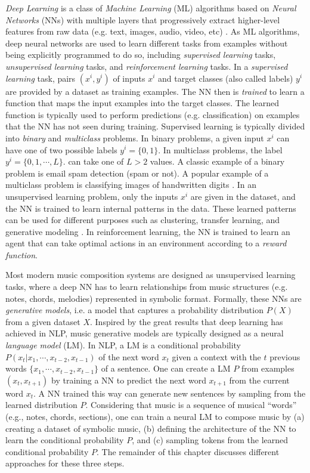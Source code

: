 \textit{Deep Learning} is a class of \textit{Machine Learning} (ML) algorithms based on \textit{Neural Networks} (NNs) with multiple layers that progressively extract higher-level features from raw data (e.g. text, images, audio, video, etc) \cite{goodfellow2016deep}. As ML algorithms, deep neural networks are used to learn different tasks from examples without being explicitly programmed to do so, including \textit{supervised learning} tasks, \textit{unsupervised learning} tasks, and \textit{reinforcement learning} tasks. In a \textit{supervised learning} task, pairs $(x^i,y^i)$ of inputs $x^i$ and target classes (also called labels) $y^i$ are provided by a dataset as training examples. The NN then is \textit{trained} to learn a function that maps the input examples into the target classes. The learned function is typically used to perform predictions (e.g. classification) on examples that the NN has not seen during training. Supervised learning is typically divided into \textit{binary} and \textit{multiclass} problems. In binary problems, a given input $x^i$ can have one of two possible labels $y^i = \{0, 1\}$. In multiclass problems, the label $y^i = \{0, 1, \cdots, L\}$. can take one of $L > 2$ values. A classic example of a binary problem is email spam detection (spam or not). A popular example of a multiclass problem is classifying images of handwritten digits \cite{lecun1998gradient}. In an unsupervised learning problem, only the inputs $x^i$ are given in the dataset, and the NN is trained to learn internal patterns in the data. These learned patterns can be used for different purposes such as clustering, transfer learning, and generative modeling \cite{bengio2012unsupervised}. In reinforcement learning, the NN is trained to learn an agent that can take optimal actions in an environment according to a \textit{reward function}.

Most modern music composition systems are designed as unsupervised learning tasks, where a deep NN has to learn relationships from music structures (e.g. notes, chords, melodies) represented in symbolic format. Formally, these NNs are \textit{generative models}, i.e. a model that captures a probability distribution $P(X)$ from a given dataset $X$. Inspired by the great results that deep learning has achieved in NLP, music generative models are typically designed as a neural \textit{language model} (LM). In NLP, a LM is a conditional probability $P(x_t|x_1, \cdots, x_{t-2}, x_{t-1})$ of the next word $x_t$ given a context with the $t$ previous words $\{x_1, \cdots, x_{t-2}, x_{t-1}\}$ of a sentence. One can create a LM $P$ from examples $(x_t, x_{t+1})$ by training a NN to predict the next word $x_{t+1}$  from the current word $x_t$. A NN trained this way can generate new sentences by sampling from the learned distribution $P$. Considering that music is a sequence of musical ``words'' (e.g., notes, chords, sections), one can train a neural LM to compose music by (a) creating a dataset of symbolic music, (b) defining the architecture of the NN to learn the conditional probability $P$, and (c) sampling tokens from the learned conditional probability $P$. The remainder of this chapter discusses different approaches for these three steps.

